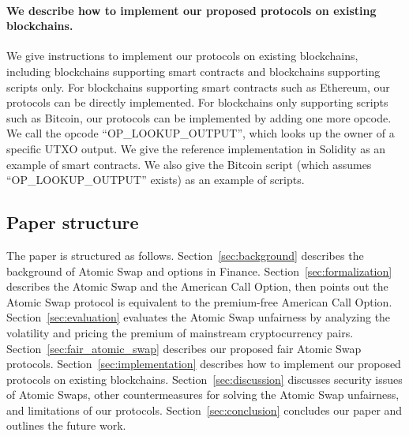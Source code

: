 \paragraph{We describe how to implement our proposed protocols on existing blockchains.}
We give instructions to implement our protocols on existing blockchains,
including blockchains supporting smart contracts and blockchains supporting scripts only.
For blockchains supporting smart contracts such as Ethereum, our protocols can be directly implemented.
For blockchains only supporting scripts such as Bitcoin, our protocols can be implemented by adding one more opcode.
We call the opcode ``OP\_LOOKUP\_OUTPUT'', which looks up the owner of a specific UTXO output.
We give the reference implementation in Solidity as an example of smart contracts.
We also give the Bitcoin script (which assumes ``OP\_LOOKUP\_OUTPUT'' exists) as an example of scripts.










\subsection{Paper structure}

The paper is structured as follows.
Section~\ref{sec:background} describes the background of Atomic Swap and options in Finance.
Section~\ref{sec:formalization} describes the Atomic Swap and the American Call Option, then points out the Atomic Swap protocol is equivalent to the premium-free American Call Option.
Section~\ref{sec:evaluation} evaluates the Atomic Swap unfairness by analyzing the volatility and pricing the premium of mainstream cryptocurrency pairs.
Section~\ref{sec:fair_atomic_swap} describes our proposed fair Atomic Swap protocols.
Section~\ref{sec:implementation} describes how to implement our proposed protocols on existing blockchains.
Section~\ref{sec:discussion} discusses security issues of Atomic Swaps, other countermeasures for solving the Atomic Swap unfairness, and limitations of our protocols.
Section~\ref{sec:conclusion} concludes our paper and outlines the future work.
